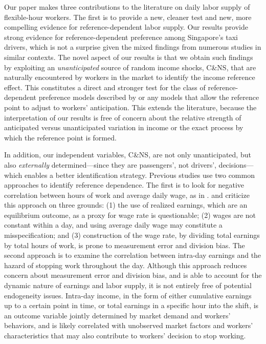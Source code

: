 \documentclass[reviewmode,AEJ]{AEA}
\begin{document}
Our paper makes three contributions to the literature on daily labor supply 
of flexible-hour workers. The first is to provide a new, cleaner test %
and new, more compelling evidence for reference-dependent labor supply. Our results provide strong evidence for reference-dependent 
preference among Singapore's taxi drivers, which is not a surprise given the mixed findings from numerous 
studies in similar contexts. The novel aspect of our results is that we obtain such findings by exploiting
an \textit{unanticipated} source of random income shocks, C\&NS, that are naturally encountered by workers
in the market to identify the income reference effect. This constitutes a direct and stronger test for the
class of reference-dependent preference models described by \citet{kHoszegi2006model} or any models that 
allow the reference point to adjust to workers' anticipation. This extends the literature, because the
interpretation of our results is free of concern about the relative strength of anticipated versus 
unanticipated variation in income or the exact process by which the reference point is formed.

In addition, our independent variables, C\&NS, are not only unanticipated, but also \textit{externally} 
determined---since they are passengers', not drivers', decisions---which enables a better identification
strategy. Previous studies use two common approaches to identify reference dependence. The first is to
look for negative correlation between hours of work and average daily wage, as in \citet{camerer1997labor}. \citet{oettinger1999empirical} and \citet{farber2005tomorrow}  criticize this approach on three grounds:
(1) the use of realized earnings, which are an equilibrium outcome, as a proxy for wage rate is questionable; 
(2) wages are not constant within a day, and using average daily wage may constitute a misspecification; and
(3) construction of the wage rate, by dividing total earnings by total hours of work, is prone to measurement
error and division bias. The second approach is to examine the correlation between intra-day earnings and
the hazard of stopping work throughout the day. Although this approach reduces concern about measurement 
error and division bias, and is able to account for the dynamic nature of earnings and labor supply, it is
not entirely free of potential endogeneity issues. Intra-day income, in the form of either cumulative earnings 
up to a certain point in time, or total earnings in a specific hour into the shift, is an outcome variable 
jointly determined by market demand and workers' behaviors, and is likely correlated with unobserved market 
factors and workers' characteristics that may also contribute to workers' decision to stop working. 
\end{document}
